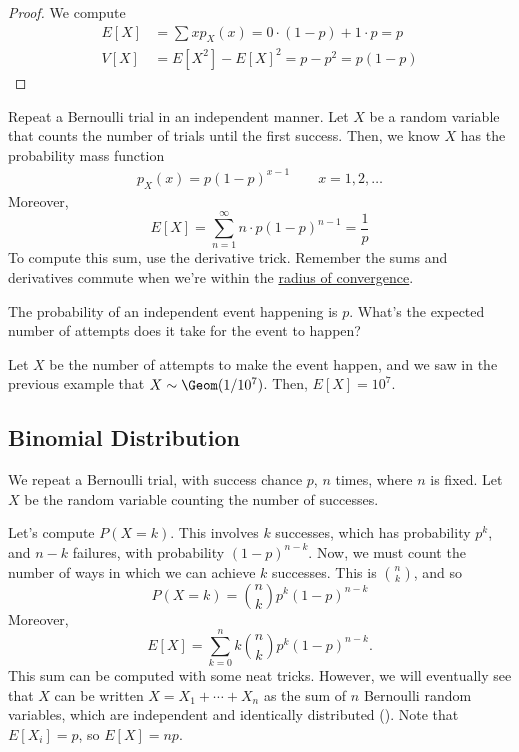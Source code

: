 \documentclass[11pt]{article}
\begin{document}
\begin{proof}
    We compute
\begin{align*}
    E[X] &=\sum xp_X(x)=0\cdot (1-p) + 1\cdot p = p
    \\ V[X] &= E[X^2]-E[X]^2 = p-p^2=p(1-p)
\end{align*}
\end{proof}

\begin{ex}
Repeat a Bernoulli trial in an independent manner. Let $X$ be a random variable that counts the number of trials until the first success. Then, we know $X$ has the probability mass function
\begin{align*}
    p_X(x) = p(1-p)^{x-1} \qquad x=1,2,\dots
\end{align*}
Moreover,
\[
E[X]= \sum_{n=1}^\infty n\cdot p(1-p)^{n-1}=\frac{1}{p}
\]
To compute this sum, use the derivative trick. Remember the sums and derivatives commute when we're within the \ul{radius of convergence}.
\end{ex}

\begin{que}
    The probability of an independent event happening is $p$. What's the expected number of attempts does it take for the event to happen?
\end{que}

\begin{solution}
    Let $X$ be the number of attempts to make the event happen, and we saw in the previous example that $X \sim \Geom( 1/ 10^7 )$. Then, $E[X]=10^7$.
\end{solution}

\subsection{Binomial Distribution}

We repeat a Bernoulli trial, with success chance $p$, $n$ times, where $n$ is fixed. Let $X$ be the random variable counting the number of successes.

Let's compute $P(X=k)$. This involves $k$ successes, which has probability $p^k$, and $n-k$ failures, with probability $(1-p)^{n-k}$. Now, we must count the number of ways in which we can achieve $k$ successes. This is $\binom{n}{k}$, and so 
\[
P(X=k)=\binom{n}{k}p^k(1-p)^{n-k}
\]
Moreover,
\[
E[X]=\sum_{k=0}^nk\binom{n}{k}p^k(1-p)^{n-k}.
\]
This sum can be computed with some neat tricks. However, we will eventually see that $X$ can be written $X = X_1+\cdots + X_n$ as the sum of $n$ Bernoulli random variables, which are independent and identically distributed (). Note that $E[X_i]=p$, so $E[X]=np$.
\end{document}

